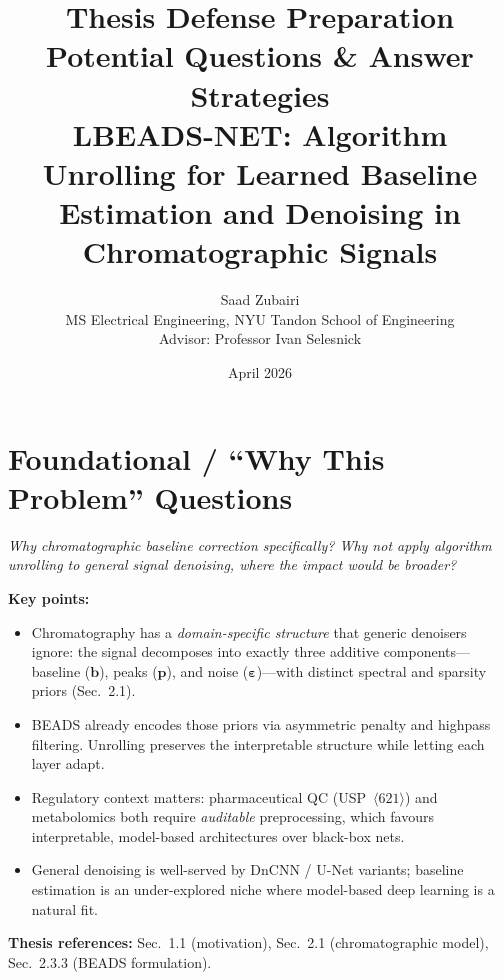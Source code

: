 \documentclass[11pt, letterpaper]{article}
\title{%
  \vspace{-1cm}
  {\sffamily\LARGE Thesis Defense Preparation}\\[6pt]
  {\sffamily\Large Potential Questions \& Answer Strategies}\\[12pt]
  {\normalfont\large
   \textbf{LBEADS-NET}: Algorithm Unrolling for Learned Baseline\\
   Estimation and Denoising in Chromatographic Signals}
}
\author{%
  Saad Zubairi\\
  \small MS Electrical Engineering, NYU Tandon School of Engineering\\
  \small Advisor: Professor Ivan Selesnick
}
\date{April 2026}
\newcounter{qcounter}
\newcommand{\question}[1]{%
  \stepcounter{qcounter}%
  \begin{questionbox}[Q\theqcounter]%
    \itshape #1%
  \end{questionbox}%
}
\begin{document}
\maketitle
\thispagestyle{empty}

\vspace{1em}
\begin{center}
\end{center}

\newpage
\tableofcontents
\newpage

\section{Foundational / ``Why This Problem'' Questions}

\setcounter{qcounter}{0}

\question{Why chromatographic baseline correction specifically?  Why not
apply algorithm unrolling to general signal denoising, where the
impact would be broader?}

\begin{answerbox}
\textbf{Key points:}
\begin{itemize}[nosep]
  \item Chromatography has a \emph{domain-specific structure} that generic
        denoisers ignore: the signal decomposes into exactly three additive
        components---baseline ($\mathbf{b}$), peaks ($\mathbf{p}$), and
        noise ($\boldsymbol{\varepsilon}$)---with distinct spectral and
        sparsity priors (Sec.~2.1).
  \item BEADS already encodes those priors via asymmetric penalty and
        highpass filtering.  Unrolling preserves the interpretable
        structure while letting each layer adapt.
  \item Regulatory context matters: pharmaceutical QC (USP~$\langle 621\rangle$)
        and metabolomics both require \emph{auditable} preprocessing, which
        favours interpretable, model-based architectures over black-box nets.
  \item General denoising is well-served by DnCNN / U-Net variants;
        baseline estimation is an under-explored niche where
        model-based deep learning is a natural fit.
\end{itemize}
\textbf{Thesis references:} Sec.~1.1 (motivation), Sec.~2.1 (chromatographic model), Sec.~2.3.3 (BEADS formulation).
\end{answerbox}
\end{document}
